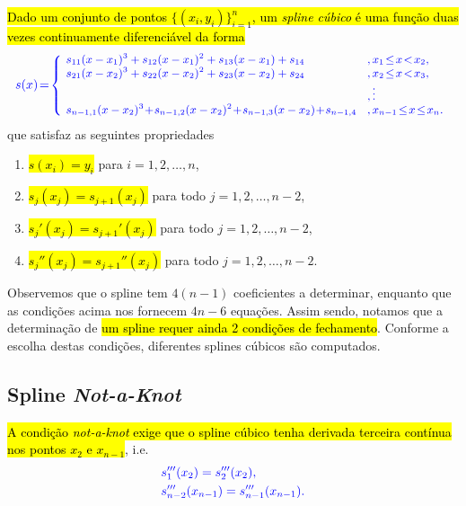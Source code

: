 \hl{Dado um conjunto de pontos $\{(x_i,y_i)\}_{i=1}^n$, um \emph{spline cúbico} é uma função duas vezes continuamente diferenciável da forma}
\begin{equation}\hleq
  \begin{small}
    s(x)\!=\!\left\{
      \begin{array}{ll}
        \!s_{11}(x-x_1)^3 + s_{12}(x-x_1)^2 + s_{13}(x-x_1) + s_{14} &,x_1\!\leq\!x\!<\!x_2,\\
        \!s_{21}(x-x_2)^3 + s_{22}(x-x_2)^2 + s_{23}(x-x_2) + s_{24} &,x_2\!\leq\!x\!<\!x_3,\\
                                                                   &, \vdots \\
        \!s_{n-1,1}(x-x_2)^3\!+\!s_{n-1,2}(x-x_2)^2\!+\!s_{n-1,3}(x-x_2)\!+\!s_{n-1,4}\!&,x_{n-1}\!\leq\!x\!\leq\!x_n.
      \end{array}
    \right.
  \end{small}
\end{equation}
que satisfaz as seguintes propriedades
\begin{enumerate}
\item \hl{$s(x_i) = y_i$} para $i=1, 2, \dotsc, n$,
\item \hl{$s_j(x_j) = s_{j+1}(x_j)$} para todo $j=1,2,\dotsc,n-2$,
\item \hl{$s_j'(x_j) = s_{j+1}'(x_j)$} para todo $j=1,2,\dotsc,n-2$,  
\item \hl{$s_j''(x_j) = s_{j+1}''(x_j)$} para todo $j=1,2,\dotsc,n-2$.
\end{enumerate}

Observemos que o spline tem $4(n-1)$ coeficientes a determinar, enquanto que as condições acima nos fornecem $4n-6$ equações. Assim sendo, notamos que a determinação de \hl{um spline requer ainda 2 condições de fechamento}. Conforme a escolha destas condições, diferentes splines cúbicos são computados.

\subsection{Spline {\it Not-a-Knot}}

\hl{A condição \textit{not-a-knot} exige que o spline cúbico tenha derivada terceira contínua nos pontos $x_2$ e $x_{n-1}$}, i.e.
\begin{subequations}\hleq
  \begin{align}
    &s_1'''(x_2) = s_2'''(x_2),\\
    &s_{n-2}'''(x_{n-1}) = s_{n-1}'''(x_{n-1}).
  \end{align}
\end{subequations}

